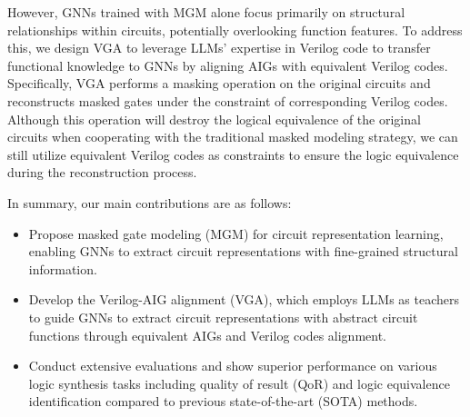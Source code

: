 However, GNNs trained with MGM alone focus primarily on structural relationships within circuits, potentially overlooking function features. 
To address this, we design VGA to leverage LLMs' expertise in Verilog code to transfer functional knowledge to GNNs by aligning AIGs with equivalent Verilog codes. 
Specifically, VGA performs a masking operation on the original circuits and reconstructs masked gates under the constraint of corresponding Verilog codes.
Although this operation will destroy the logical equivalence of the original circuits when cooperating with the traditional masked modeling strategy, we can still utilize equivalent Verilog codes as constraints to ensure the logic equivalence during the reconstruction process.

In summary, our main contributions are as follows:
\begin{itemize}
\item Propose masked gate modeling (MGM) for circuit representation learning, enabling GNNs to extract circuit representations with fine-grained structural information.
\item Develop the Verilog-AIG alignment (VGA), which employs LLMs as teachers to guide GNNs to extract circuit representations with abstract circuit functions through equivalent AIGs and Verilog codes alignment.
\item Conduct extensive evaluations and show superior performance on various logic synthesis tasks including quality of result (QoR) and logic equivalence identification compared to previous state-of-the-art (SOTA) methods.
\end{itemize}
